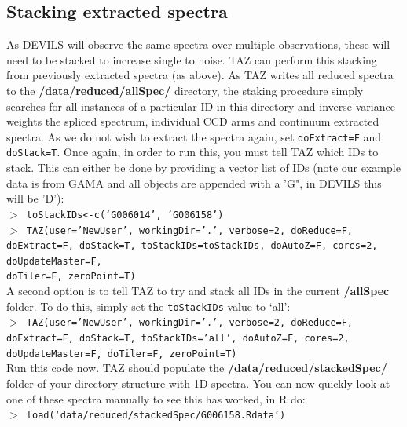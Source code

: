 \documentclass[12pt]{article}
\begin{document}
 \subsection{Stacking extracted spectra}
 
 As DEVILS will observe the same spectra over multiple observations, these will need to be stacked to increase single to noise. TAZ can perform this stacking from previously extracted spectra (as above). As TAZ writes all reduced spectra to the \textbf{/data/reduced/allSpec/} directory, the staking procedure simply searches for all instances of a particular ID in this directory and inverse variance weights the spliced spectrum, individual CCD arms and continuum extracted spectra. As we do not wish to extract the spectra again, set \texttt{doExtract=F} and \texttt{doStack=T}. Once again, in order to run this, you must tell TAZ which IDs to stack. This can either be done by providing a vector list of IDs (note our example data is from GAMA and all objects are appended with a 'G", in DEVILS this will be 'D'):\\
 
   \hspace{10mm} \texttt{$>$ toStackIDs<-c(`G006014', 'G006158')}\\
 
  \hspace{10mm} \texttt{$>$ TAZ(user='NewUser', workingDir='.', verbose=2, doReduce=F, doExtract=F, doStack=T,  toStackIDs=toStackIDs, doAutoZ=F, cores=2, doUpdateMaster=F, \\ doTiler=F, zeroPoint=T)}\\ 
  
 A second option is to tell TAZ to try and stack all IDs in the current \textbf{/allSpec} folder. To do this, simply set the \texttt{toStackIDs} value to `all': \\
  

  \hspace{10mm} \texttt{$>$ TAZ(user='NewUser', workingDir='.', verbose=2, doReduce=F, doExtract=F, doStack=T,  toStackIDs='all', doAutoZ=F, cores=2, doUpdateMaster=F, doTiler=F, zeroPoint=T)}\\   

Run this code now. TAZ should populate the \textbf{/data/reduced/stackedSpec/} folder of your directory structure with 1D spectra. You can now quickly look at one of these spectra manually to see this has worked, in R do:\\

\hspace{10mm} \texttt{$>$ load(`data/reduced/stackedSpec/G006158.Rdata')} \\
\end{document}
